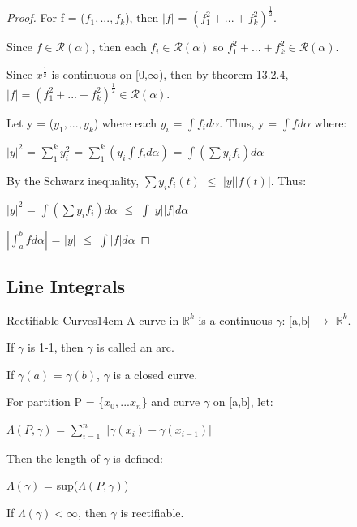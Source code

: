     \begin{proof}
        For f = ($f_1,...,f_k$), then $|f|$ = $(f_1^2 + ... + f_k^2)^{\frac{1}{2}}$.

        Since $f \in \mathscr{R}(\alpha)$,
        then each $f_i \in \mathscr{R}(\alpha)$ so
        $f_1^2+...+f_k^2 \in \mathscr{R}(\alpha)$.

        Since $x^{\frac{1}{2}}$ is continuous on [0,$\infty$), then by
        {\color{red} theorem 13.2.4},
        $|f| = (f_1^2 + ... + f_k^2)^{\frac{1}{2}} \in \mathscr{R}(\alpha)$.

        Let y = ($y_1,...,y_k$) where each $y_i$ = $\int f_i d\alpha$.
        Thus, y = $\int f d\alpha$ where:

        \hspace{0.5cm}
        $|y|^2$
        = $\sum_1^k y_i^2$
        = $\sum_1^k (y_i \int f_i d\alpha)$
        = $\int (\sum y_i f_i) d\alpha$

        By the Schwarz inequality, 
        $\sum y_i f_i(t)$ $\leq$ $|y| |f(t)|$.
        Thus:

        \hspace{0.5cm}
        $|y|^2$
        = $\int (\sum y_i f_i) d\alpha$
        $\leq$ $\int |y| |f| d\alpha$

        \hspace{0.5cm}
        $|\int_a^b f d\alpha|$
        = $|y|$ $\leq$ $\int |f| d\alpha$    
    \end{proof}

    \newpage





\subsection{ Line Integrals }

    \begin{definition}{Rectifiable Curves}{14cm}
        A curve in $\mathbb{R}^k$ is a continuous
        $\gamma$: [a,b] $\rightarrow$ $\mathbb{R}^k$.

        \hspace{0.5cm}
        If $\gamma$ is 1-1, then $\gamma$ is called an arc.

        \hspace{0.5cm}
        If $\gamma(a)$ = $\gamma(b)$, $\gamma$ is a closed curve.

        \vspace{0.2cm}

        For partition P = \{$x_0,...x_n$\} and curve $\gamma$ on [a,b], let:

        \hspace{0.5cm}
        $\Lambda(P,\gamma)$
        = $\sum_{i=1}^n$ $|\gamma(x_i) - \gamma(x_{i-1})|$

        Then the length of $\gamma$ is defined:

        \hspace{0.5cm}
        $\Lambda(\gamma)$ = sup($\Lambda(P,\gamma)$)

        If $\Lambda(\gamma) < \infty$, then $\gamma$ is rectifiable.        
    \end{definition}


